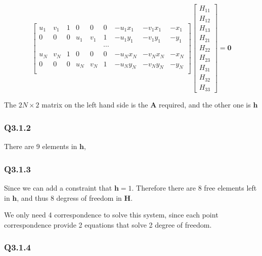 \documentclass[11pt]{article}
\begin{document}
\begin{equation}
    \begin{bmatrix}
        u_{1} & v_{1} & 1 & 0 & 0 & 0 & -u_{1} x_{1} & -v_{1} x_{1} & -x_{1} \\
        0 & 0 & 0 & u_{1} & v_{1} & 1 & -u_{1} y_{1} & -v_{1} y_{1} & -y_{1} \\
        &&&&&\cdots &&& \\
        u_{N} & v_{N} & 1 & 0 & 0 & 0 & -u_{N} x_{N} & -v_{N} x_{N} & -x_{N} \\
        0 & 0 & 0 & u_{N} & v_{N} & 1 & -u_{N} y_{N} & -v_{N} y_{N} & -y_{N} \\
    \end{bmatrix}
    \begin{bmatrix}
        H_{11} \\ H_{12} \\ H_{13} \\
        H_{21} \\ H_{22} \\ H_{23} \\
        H_{31} \\ H_{32} \\ H_{33}
    \end{bmatrix}
    = \mathbf{0}
\end{equation}

The $2N\times 2$ matrix on the left hand side is the $\mathbf{A}$ required, and the other one is $\mathbf{h}$

\subsubsection*{Q3.1.2}

There are 9 elements in $\mathbf{h}$,

\subsubsection*{Q3.1.3}

Since we can add a constraint that $\mathbf{h} = 1$. Therefore there are 8 free elements left in $\mathbf{h}$, and thus 8 degress of freedom in $\mathbf{H}$.

We only need 4 correspondence to solve this system, since each point correspondence provide 2 equations that solve 2 degree of freedom.

\subsubsection*{Q3.1.4}
\end{document}
